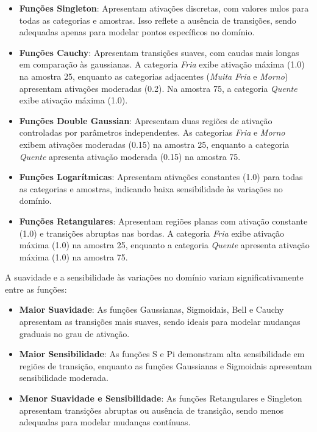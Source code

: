 \documentclass[a4paper,12pt]{article}
\begin{document}
\begin{itemize}
    \item \textbf{Funções Singleton}: Apresentam ativações discretas, com valores nulos para todas as categorias e amostras. Isso reflete a ausência de transições, sendo adequadas apenas para modelar pontos específicos no domínio.

    \item \textbf{Funções Cauchy}: Apresentam transições suaves, com caudas mais longas em comparação às gaussianas. A categoria \textit{Fria} exibe ativação máxima (1.0) na amostra 25, enquanto as categorias adjacentes (\textit{Muita Fria} e \textit{Morno}) apresentam ativações moderadas (0.2). Na amostra 75, a categoria \textit{Quente} exibe ativação máxima (1.0).

    \item \textbf{Funções Double Gaussian}: Apresentam duas regiões de ativação controladas por parâmetros independentes. As categorias \textit{Fria} e \textit{Morno} exibem ativações moderadas (0.15) na amostra 25, enquanto a categoria \textit{Quente} apresenta ativação moderada (0.15) na amostra 75.

    \item \textbf{Funções Logarítmicas}: Apresentam ativações constantes (1.0) para todas as categorias e amostras, indicando baixa sensibilidade às variações no domínio.

    \item \textbf{Funções Retangulares}: Apresentam regiões planas com ativação constante (1.0) e transições abruptas nas bordas. A categoria \textit{Fria} exibe ativação máxima (1.0) na amostra 25, enquanto a categoria \textit{Quente} apresenta ativação máxima (1.0) na amostra 75.
\end{itemize}

A suavidade e a sensibilidade às variações no domínio variam significativamente entre as funções:

\begin{itemize}
    \item \textbf{Maior Suavidade}: As funções Gaussianas, Sigmoidais, Bell e Cauchy apresentam as transições mais suaves, sendo ideais para modelar mudanças graduais no grau de ativação.
    \item \textbf{Maior Sensibilidade}: As funções S e Pi demonstram alta sensibilidade em regiões de transição, enquanto as funções Gaussianas e Sigmoidais apresentam sensibilidade moderada.
    \item \textbf{Menor Suavidade e Sensibilidade}: As funções Retangulares e Singleton apresentam transições abruptas ou ausência de transição, sendo menos adequadas para modelar mudanças contínuas.
\end{itemize}
\end{document}
